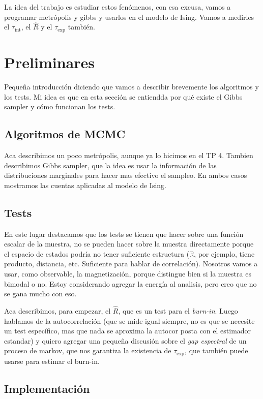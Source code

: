 \documentclass[a4paper, 12pt]{article}
\newcommand{\R}{\mathbb{R}}
\newcommand{\tauint}{\tau_\text{int}}
\newcommand{\tauexp}{\tau_\text{exp}}
\begin{document}
La idea del trabajo es estudiar estos fenómenos, con esa excusa, vamos a programar metrópolis y gibbs y usarlos en el modelo de Ising. Vamos a medirles el $\tauint$, el $\hat{R}$ y el $\tauexp$ también.

\section{Preliminares}

Pequeña introducción diciendo que vamos a describir brevemente los algoritmos y los tests. Mi idea es que en esta sección se entiendda por qué existe el Gibbs sampler y cómo funcionan los tests.

\subsection{Algoritmos de MCMC}

Aca describimos un poco metrópolis, aunque ya lo hicimos en el TP 4. Tambien describimos Gibbs sampler, que la idea es usar la información de las distribuciones marginales para hacer mas efectivo el sampleo. En ambos casos mostramos las cuentas aplicadas al modelo de Ising.

\subsection{Tests}

En este lugar destacamos que los tests se tienen que hacer sobre una función escalar de la muestra, no se pueden hacer sobre la muestra directamente porque el espacio de estados podría no tener suficiente estructura ($\R$, por ejemplo, tiene producto, distancia, etc. Suficiente para hablar de correlación). Nosotros vamos a usar, como observable, la magnetización, porque distingue bien si la muestra es bimodal o no. Estoy considerando agregar la energía al analisis, pero creo que no se gana mucho con eso.

Aca describimos, para empezar, el $\hat{R}$, que es un test para el {\it burn-in}. Luego hablamos de la autocorrelación (que se mide igual siempre, no es que se necesite un test específico, mas que nada se aproxima la autocor posta con el estimador estandar) y quiero agregar una pequeña discusión sobre el {\it gap espectral} de un proceso de markov, que nos garantiza la existencia de $\tauexp$, que también puede usarse para estimar el burn-in.

\subsection{Implementación}
\end{document}

